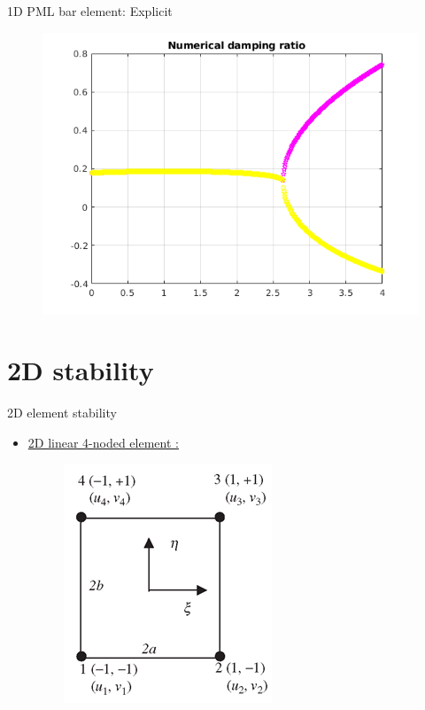 \begin{frame}{1D PML bar element: Explicit}
\begin{figure}[ht]
\begin{minipage}[b]{0.5\linewidth}
  \end{minipage}%
  \begin{minipage}[b]{0.5\linewidth}
    \centering
    \includegraphics[scale=.35]{images/pml1d-exp-4.png} \\

  \end{minipage} 
\end{figure}
\end{frame}

\section{2D stability}
\begin{frame}{2D element stability}
\begin{itemize}
\item \underline{2D linear 4-noded element :}
\begin{figure}
\centering
\includegraphics[width=0.4\linewidth]{images/square2d.png}
\end{figure}
\end{itemize}
\end{frame}

